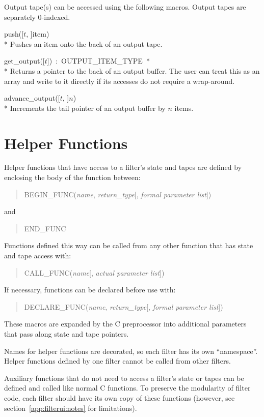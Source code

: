 Output tape(s) can be accessed using the following macros. Output tapes are separately 0-indexed.
\begin{description}
\item \textsf{push([$t$, ]item)} \\*
Pushes an item onto the back of an output tape.
\item \textsf{get\_output([$t$])~:~OUTPUT\_ITEM\_TYPE~*} \\*
Returns a pointer to the back of an output buffer. The user can treat this as an array and write to it directly if its accesses do not require a wrap-around.
\item \textsf{advance\_output([$t$, ]$n$)} \\*
Increments the tail pointer of an output buffer by $n$ items.
\end{description}

\section{Helper Functions}

Helper functions that have access to a filter's state and tapes are defined by enclosing the body of the function between:
\begin{quote}
\textsf{BEGIN\_FUNC(\emph{name}, \emph{return\_type}[, \emph{formal parameter list}])}
\end{quote}
and
\begin{quote}
\textsf{END\_FUNC}
\end{quote}
Functions defined this way can be called from any other function that has state and tape access with:
\begin{quote}
\textsf{CALL\_FUNC(\emph{name}[, \emph{actual parameter list}])}
\end{quote}
If necessary, functions can be declared before use with:
\begin{quote}
\textsf{DECLARE\_FUNC(\emph{name}, \emph{return\_type}[, \emph{formal parameter list}])}
\end{quote}
These macros are expanded by the C preprocessor into additional parameters that pass along state and tape pointers.

Names for helper functions are decorated, so each filter has its own ``namespace''. Helper functions defined by one filter cannot be called from other filters.

Auxiliary functions that do not need to access a filter's state or tapes can be defined and called like normal C functions. To preserve the modularity of filter code, each filter should have its own copy of these functions (however, see section~\ref{app:filterui:notes} for limitations).

